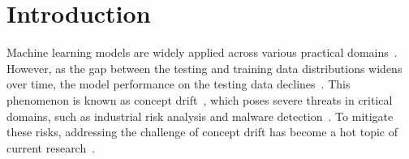 \documentclass[conference,compsoc]{IEEEtran} %
\begin{document}

		
		
		
		\IEEEpeerreviewmaketitle

		
		\section{Introduction}
\label{Sec: Introduction}
Machine learning models are widely applied across various practical domains~\cite{2024-AAAI-AoA-estimation,2024-AAAI-Anomalous-User-Detection-on-Twitter,2024-AAAI-Designing-Biological-Sequences,2024-AAAI-Rumor-Detection}.
However, as the gap between the testing and training data distributions widens over time, the model performance on the testing data declines~\cite{malekghaini2023deep,rabanser2019failing}.
This phenomenon is known as concept drift~\cite{2018-CCF-A-concept-drift-A-review,2024-1Q-An-overview-CDA,2024-1Q-survey-CDA}, which poses severe threats in critical domains, such as industrial risk analysis and malware detection~\cite{fernando2024fesad,yang2024recda}.
To mitigate these risks, addressing the challenge of concept drift has become a hot topic of current research~\cite{2023-Q1-Concept-drift-handling,2023-Detecting-group-concept-drift-from-multiple-data-streams-1qu,2021-GlobalCOM-pwage,aaaiYuLZ024}.
\end{document}
